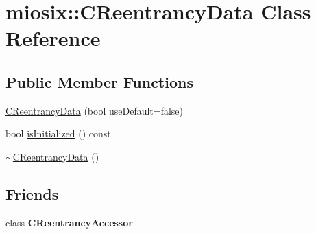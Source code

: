\hypertarget{classmiosix_1_1_c_reentrancy_data}{\section{miosix\-:\-:C\-Reentrancy\-Data Class Reference}
\label{classmiosix_1_1_c_reentrancy_data}
}
\subsection*{Public Member Functions}
\begin{DoxyCompactItemize}
\item 
\hyperlink{classmiosix_1_1_c_reentrancy_data_af464e5f8e17ca97cefde0f183f533e29}{C\-Reentrancy\-Data} (bool use\-Default=false)
\item 
bool \hyperlink{classmiosix_1_1_c_reentrancy_data_a8fa7028649a26e40613e7fc56eca2a18}{is\-Initialized} () const 
\item 
\hyperlink{classmiosix_1_1_c_reentrancy_data_a79ea8178ee3621ba8f798f94a1a498c0}{$\sim$\-C\-Reentrancy\-Data} ()
\end{DoxyCompactItemize}
\subsection*{Friends}
\begin{DoxyCompactItemize}
\item 
\hypertarget{classmiosix_1_1_c_reentrancy_data_a50d12034b3fec16c639239e059894524}{class {\bfseries C\-Reentrancy\-Accessor}}\label{classmiosix_1_1_c_reentrancy_data_a50d12034b3fec16c639239e059894524}

\end{DoxyCompactItemize}


